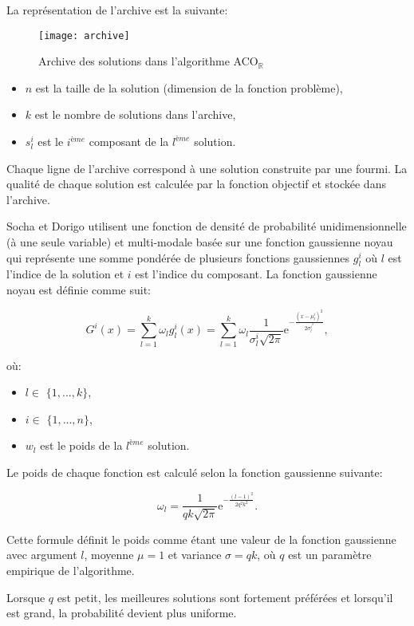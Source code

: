 La représentation de l'archive est la suivante:

\begin{figure}[H]
	\centering
	\texttt{[image: archive]}
	\caption{Archive des solutions dans l'algorithme ACO$_\mathbb{R}$}
\end{figure}


\begin{itemize}
	\item $n$ est la taille de la solution (dimension de la fonction problème),
	\item $k$ est le nombre de solutions dans l'archive,
	\item $s^i_l$ est le $i^{ème}$ composant de la $l^{ème}$ solution.
\end{itemize}

Chaque ligne de l'archive correspond à une solution construite par une fourmi. La
qualité de chaque solution est calculée par la fonction objectif et stockée
dans l'archive.

Socha et Dorigo utilisent une fonction de densité de probabilité unidimensionnelle (à une seule variable) et multi-modale basée sur une fonction gaussienne noyau qui représente une somme pondérée de plusieurs fonctions gaussiennes $g^i_l$  où $l$ est l'indice de la solution et $i$ est l'indice du composant. La fonction gaussienne noyau est définie comme suit:

$$
G^i (x) = \sum^{k}_{l=1} \omega_l g_l^i(x) = \sum^{k}_{l=1} \omega_l \frac{1}{\sigma^i_l \sqrt{2\pi}} \mathrm{e}^{-\frac{(x-\mu^i_l)^2}{2\sigma_l^{i^2}}}
,$$

où:
\begin{itemize}
	\item $l \in$ $\{1,...,k\}$,
	\item $i \in$ $\{1,...,n\}$,
	\item $w_l$ est le poids de la $l^{ème}$ solution.
\end{itemize}


Le poids de chaque fonction est calculé selon la fonction gaussienne suivante:

$$
\omega_l = \frac{1}{qk\sqrt{2\pi}} \textrm{e}^{-\frac{(l-1)^2}{2q^2 k^2}}.
$$

Cette formule définit le poids comme étant une valeur de la fonction
gaussienne avec argument $l$, moyenne $\mu=1$ et variance $\sigma=qk$,  où $q$ est un paramètre empirique de l'algorithme.

Lorsque $q$ est petit, les meilleures solutions sont fortement préférées et lorsqu'il est grand, la probabilité devient plus uniforme.

